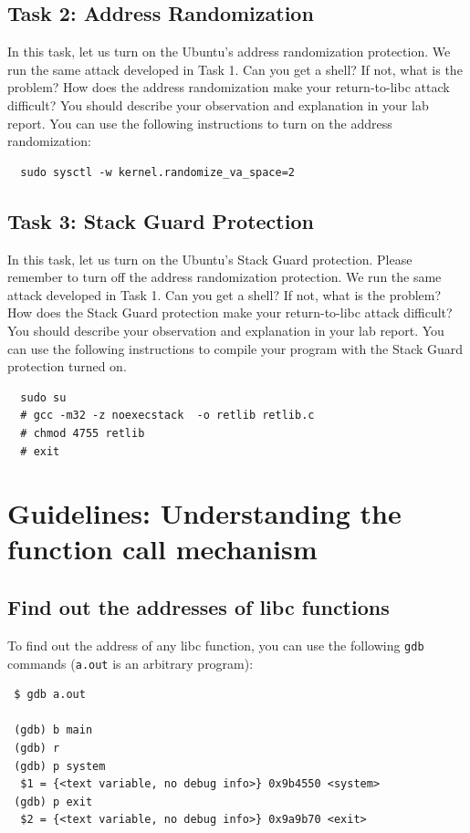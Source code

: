 \subsection{Task 2: Address Randomization}

In this task, let us turn on the Ubuntu's address randomization protection.  
We run the same attack developed in Task 1. Can you get a shell? If not, 
what is the problem? How does the address randomization
make your return-to-libc attack difficult?
You should describe your observation and explanation
in your lab report. You can use the following instructions to turn
on the address randomization:

\begin{verbatim}
  sudo sysctl -w kernel.randomize_va_space=2
\end{verbatim}



\subsection{Task 3: Stack Guard Protection}

In this task, let us turn on the Ubuntu's Stack Guard protection.  
Please remember to turn off the address randomization protection. 
We run the same attack developed in Task 1. Can you get a shell? If not, 
what is the problem? How does the Stack Guard protection
make your return-to-libc attack difficult?
You should describe your observation and explanation
in your lab report. You can use the following instructions to compile
your program with the Stack Guard protection turned on.

\begin{verbatim}
  sudo su
  # gcc -m32 -z noexecstack  -o retlib retlib.c
  # chmod 4755 retlib
  # exit  
\end{verbatim}


\section{Guidelines: Understanding the function call mechanism}

\subsection{Find out the addresses of libc functions} 

To find out the address of any libc function, you can use the following
{\tt gdb} commands ({\tt a.out} is an arbitrary program):
\begin{verbatim}
 $ gdb a.out

 (gdb) b main
 (gdb) r
 (gdb) p system
  $1 = {<text variable, no debug info>} 0x9b4550 <system>
 (gdb) p exit
  $2 = {<text variable, no debug info>} 0x9a9b70 <exit>
\end{verbatim}

